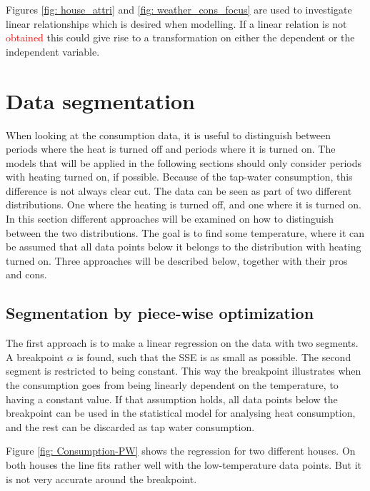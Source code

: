 Figures \ref{fig: house_attri} and \ref{fig: weather_cons_focus} are used to investigate linear relationships which is desired when modelling. If a linear relation is not \textcolor{red}{obtained} this could give rise to a transformation on either the dependent or the independent variable.  

\section{Data segmentation}
When looking at the consumption data, it is useful to distinguish between
periods where the heat is turned off and periods where it is turned on.
The models that will be applied in the following sections should only consider periods with heating turned on, if possible.
Because of the tap-water consumption, this difference is not always clear cut.
The data can be seen as part of two different distributions. One where the
heating is turned off, and one where it is turned on. In this section different 
approaches will be examined on how to distinguish between the two distributions.
The goal is to find some temperature, where it can be assumed that all data points below it
belongs to the distribution with heating turned on. Three approaches will be described below, together with their pros and cons.

\subsection*{Segmentation by piece-wise optimization}
The first approach is to make a linear regression on the data with two segments.
A breakpoint $\alpha$ is found, such that the SSE is as small as possible.
The second segment is restricted to being constant. This way the breakpoint
illustrates when the consumption goes from being linearly dependent on the temperature,
to having a constant value. If that assumption holds, all data points below the breakpoint
can be used in the statistical model for analysing heat consumption, and the rest can be discarded
as tap water consumption.

Figure \ref{fig: Consumption-PW} shows the regression for two different houses. On both houses the
line fits rather well with the low-temperature data points. But it is not very accurate around the breakpoint.


